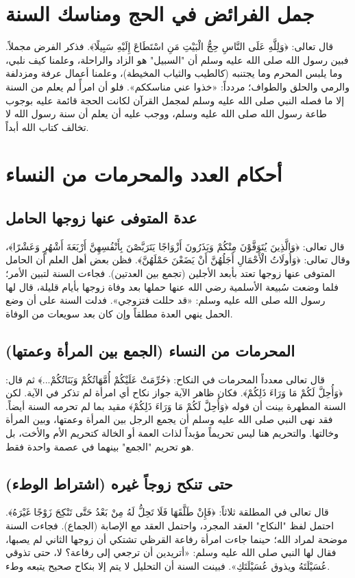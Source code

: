 \section{جمل الفرائض في الحج ومناسك السنة}
قال تعالى: ﴿وَلِلَّهِ عَلَى النَّاسِ حِجُّ الْبَيْتِ مَنِ اسْتَطَاعَ إِلَيْهِ سَبِيلًا﴾. فذكر الفرض مجملاً.
فبين رسول الله صلى الله عليه وسلم أن "السبيل" هو الزاد والراحلة، وعلمنا كيف نلبي، وما يلبس المحرم وما يجتنبه (كالطيب والثياب المخيطة)، وعلمنا أعمال عرفة ومزدلفة والرمي والحلق والطواف؛ مردداً: «خذوا عني مناسككم».
فلو أن امرأً لم يعلم من السنة إلا ما فصله النبي صلى الله عليه وسلم لمجمل القرآن لكانت الحجة قائمة عليه بوجوب طاعة رسول الله صلى الله عليه وسلم، ووجب عليه أن يعلم أن سنة رسول الله لا تخالف كتاب الله أبداً.

\section{أحكام العدد والمحرمات من النساء}

\subsection{عدة المتوفى عنها زوجها الحامل}
قال تعالى: ﴿وَالَّذِينَ يُتَوَفَّوْنَ مِنْكُمْ وَيَذَرُونَ أَزْوَاجًا يَتَرَبَّصْنَ بِأَنْفُسِهِنَّ أَرْبَعَةَ أَشْهُرٍ وَعَشْرًا﴾، وقال تعالى: ﴿وَأُولَاتُ الْأَحْمَالِ أَجَلُهُنَّ أَنْ يَضَعْنَ حَمْلَهُنَّ﴾.
فظن بعض أهل العلم أن الحامل المتوفى عنها زوجها تعتد بأبعد الأجلين (تجمع بين العدتين). فجاءت السنة لتبين الأمر؛ فلما وضعت سُبيعة الأسلمية رضي الله عنها حملها بعد وفاة زوجها بأيام قليلة، قال لها رسول الله صلى الله عليه وسلم: «قد حللت فتزوجي». فدلت السنة على أن وضع الحمل ينهي العدة مطلقاً وإن كان بعد سويعات من الوفاة.

\subsection{المحرمات من النساء (الجمع بين المرأة وعمتها)}
قال تعالى معدداً المحرمات في النكاح: ﴿حُرِّمَتْ عَلَيْكُمْ أُمَّهَاتُكُمْ وَبَنَاتُكُمْ...﴾ ثم قال: ﴿وَأُحِلَّ لَكُمْ مَا وَرَاءَ ذَلِكُمْ﴾.
فكان ظاهر الآية جواز نكاح أي امرأة لم تذكر في الآية. لكن السنة المطهرة بينت أن قوله ﴿وَأُحِلَّ لَكُمْ مَا وَرَاءَ ذَلِكُمْ﴾ مقيد بما لم تحرمه السنة أيضاً. فقد نهى النبي صلى الله عليه وسلم أن يجمع الرجل بين المرأة وعمتها، وبين المرأة وخالتها. والتحريم هنا ليس تحريماً مؤبداً لذات العمة أو الخالة كتحريم الأم والأخت، بل هو تحريم "الجمع" بينهما في عصمة واحدة فقط.

\subsection{حتى تنكح زوجاً غيره (اشتراط الوطء)}
قال تعالى في المطلقة ثلاثاً: ﴿فَإِنْ طَلَّقَهَا فَلَا تَحِلُّ لَهُ مِنْ بَعْدُ حَتَّى تَنْكِحَ زَوْجًا غَيْرَهُ﴾. احتمل لفظ "النكاح" العقد المجرد، واحتمل العقد مع الإصابة (الجماع). فجاءت السنة موضحة لمراد الله؛ حينما جاءت امرأة رفاعة القرظي تشتكي أن زوجها الثاني لم يصبها، فقال لها النبي صلى الله عليه وسلم: «أتريدين أن ترجعي إلى رفاعة؟ لا، حتى تذوقي عُسَيْلَتَهُ ويذوق عُسَيْلَتَكِ». فبينت السنة أن التحليل لا يتم إلا بنكاح صحيح يتبعه وطء.

